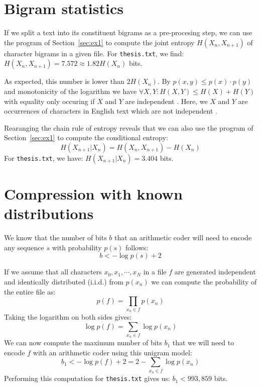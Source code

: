 \documentclass[10pt,a4paper,oneside,onecolumn]{article}
\newcommand*{\thesisTXT}{{\tt thesis.txt}\xspace}
\newcommand*{\iid}{i.i.d.\xspace}
\begin{document}
\section{Bigram statistics}\label{sec:ex2}

If we split a text into its constituent bigrams as a pre-procesing step, we can
use the program of Section~\ref{sec:ex1} to compute the joint entropy $H(X_n,
X_{n+1})$ of character bigrams in a given file. For \thesisTXT, we
find: $H(X_n, X_{n+1}) = 7.572 \approx 1.82H(X_n)$ bits.\footnotemark
{}

As expected, this number is lower than $2H(X_n)$. By $p(x,y) \le p(x) \cdot
p(y)$ and monotonicity of the logarithm we have $\forall X,Y: H(X, Y) \le H(X) +
H(Y)$ with equality only occuring if $X$ and $Y$ are independent
\cite[p.~138]{mackay}. Here, we $X$ and $Y$ are occurrences of characters in
English text which are not independent \cite[p.~22-24]{mackay}.

Rearanging the chain rule of entropy \cite[p.~139]{mackay} reveals that we can
also use the program of Section~\ref{sec:ex1} to compute the conditional
entropy:
\begin{equation}
    H(X_{n+1} | X_n) = H(X_n, X_{n+1}) - H(X_n)
\end{equation}
For \thesisTXT, we have: $H(X_{n+1} | X_n) = 3.404$ bits.

\section{Compression with known distributions}\label{sec:ex3}

We know \cite[p.~21]{it4} that the number of bits $b$ that an arithmetic coder
will need to encode any sequence $s$ with probability $p(s)$ follows:
\begin{equation}
    b < -\log p(s) + 2
\end{equation}

If we assume that all characters $x_0, x_1, \cdots, x_N$ in a file $f$ are
generated independent and identically distributed (\iid) from $p(x_n)$ we can
compute the probability of the entire file as:
\begin{equation}
    p(f) = \prod\limits_{x_n \in f} p(x_n)
\end{equation}
Taking the logarithm on both sides gives:
\begin{equation}\label{eq:unigram-logprob}
    \log p(f) = \sum\limits_{x_n \in f} \log p(x_n)
\end{equation}
We can now compute the maximum number of bits $b_1$ that we will need to encode
$f$ with an arithmetic coder using this unigram model:
\begin{equation}\label{eq:unigram-nbits}
    b_1 < -\log p(f) + 2 = 2 - \sum\limits_{x_n \in f} \log p(x_n)
\end{equation}
Performing this computation for \thesisTXT gives us: $b_1 < 993,859$ bits.
\end{document}
